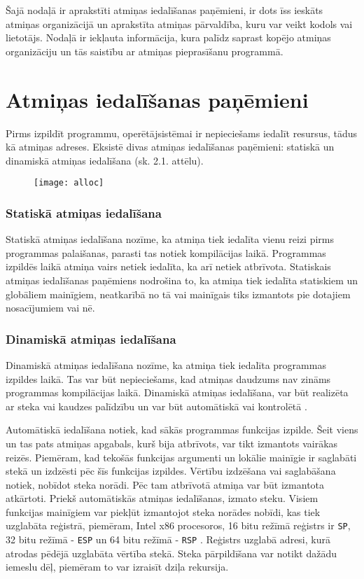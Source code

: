 ﻿Šajā nodaļā ir aprakstīti atmiņas iedalīšanas paņēmieni, ir dots īss ieskāts atmiņas organizācijā un aprakstīta atmiņas pārvaldība, kuru var veikt kodols vai lietotājs.
Nodaļā ir iekļauta informācija, kura palīdz saprast kopējo atmiņas organizāciju un tās saistību ar atmiņas pieprasīšanu programmā. 
\section{Atmiņas iedalīšanas paņēmieni}

Pirms izpildīt programmu, operētājsistēmai ir nepieciešams iedalīt resursus, tādus kā atmiņas adreses.  
Eksistē divas atmiņas iedalīšanas paņēmieni: statiskā un dinamiskā atmiņas iedalīšana (sk. 2.1. attēlu). 

\begin{figure}[h]
\begin{center}
\texttt{[image: alloc]}
\end{center}
\caption{\textbf{\fontsize{11}{12}\selectfont {Atmiņas iedalīšanas paņēmienu klasifikācija}}}
\label{fig:alloc}
\end{figure}


\subsubsection{Statiskā atmiņas iedalīšana}
Statiskā atmiņas iedalīšana nozīme, ka atmiņa tiek iedalīta vienu reizi pirms programmas palaišanas, parasti tas notiek kompilācijas laikā.
Programmas izpildēs laikā atmiņa vairs netiek iedalīta, ka arī netiek atbrīvota. 
Statiskais atmiņas iedalīšanas paņēmiens nodrošina to, ka atmiņa tiek iedalīta statiskiem un globāliem mainīgiem, neatkarībā no tā vai mainīgais tiks izmantots pie dotajiem nosacījumiem vai nē.

\subsubsection{Dinamiskā atmiņas iedalīšana}
Dinamiskā atmiņas iedalīšana nozīme, ka atmiņa tiek iedalīta programmas izpildes laikā.
Tas var būt nepieciešams, kad atmiņas daudzums nav zināms programmas kompilācijas laikā. 
Dinamiskā atmiņas iedalīšana, var būt realizēta ar steka vai kaudzes palīdzību un var būt automātiskā vai kontrolētā \cite{SDMA}.

Automātiskā iedalīšana notiek, kad sākās programmas funkcijas izpilde. 
Šeit viens un tas pats atmiņas apgabals, kurš bija atbrīvots, var tikt izmantots  vairākas reizēs. 
Piemēram, kad tekošās funkcijas argumenti un lokālie mainīgie ir saglabāti stekā un izdzēsti pēc šīs funkcijas izpildes. 
Vērtību izdzēšana vai saglabāšana notiek, nobīdot steka norādi.
Pēc tam atbrīvotā atmiņa var būt izmantota atkārtoti. 
Priekš automātiskās atmiņas iedalīšanas, izmato steku.
Visiem funkcijas mainīgiem var piekļūt izmantojot steka norādes nobīdi, kas tiek uzglabāta reģistrā, piemēram,  
Intel x86 procesoros, 16 bitu režīmā reģistrs ir \texttt{SP}, 32 bitu režīmā - \texttt{ESP} un 64 bitu režīmā - \texttt{RSP} \cite{JCL}.
Reģistrs uzglabā adresi, kurā atrodas pēdējā uzglabāta vērtība stekā.
Steka pārpildīšana var notikt dažādu iemeslu dēļ, piemēram to var izraisīt dziļa rekursija.
 
